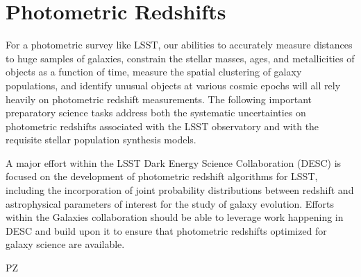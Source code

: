 \section{Photometric Redshifts}\label{sec:tasks:photo_z}  
{\justify
For a photometric survey like LSST, our abilities to accurately measure distances to huge samples of galaxies, constrain the stellar masses, ages, and metallicities of objects as a function of time, measure the spatial clustering of galaxy populations, and identify unusual objects at various cosmic epochs will all rely heavily on
photometric redshift measurements.
The following important preparatory science tasks address both the systematic uncertainties on photometric redshifts associated with the LSST observatory and with the requisite
stellar population synthesis models.

A major effort within the LSST Dark Energy Science Collaboration (DESC) is focused on the development of photometric redshift algorithms for LSST, including the incorporation of joint probability distributions between redshift and astrophysical parameters of interest for the study of galaxy evolution.  Efforts within the Galaxies collaboration should be able to leverage work happening in DESC and build upon it to ensure that photometric redshifts optimized for galaxy science are available.

\begin{tasklist}{PZ}

\end{tasklist}}
